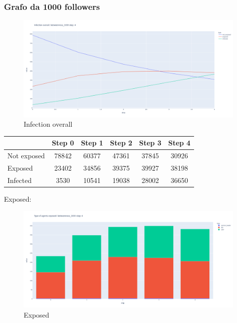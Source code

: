         \subsubsection{Grafo da 1000 followers}
            \begin{figure}[H]
                \includegraphics[width=16cm]{resources/charts/btw_1000_line.png}
                \caption{Infection overall}
                \label{fig:btw_1000_line}
            \end{figure}
            
            \begin{table}[H]
                \centering
                \begin{tabular}{|l|c|c|c|c|c|}
                \hline
                            & Step 0 & Step 1 & Step 2 & Step 3 & Step 4 \\ \hline
                Not exposed & 78842  & 60377  & 47361  & 37845  & 30926  \\ \hline
                Exposed     & 23402  & 34856  & 39375  & 39927  & 38198  \\ \hline
                Infected    & 3530   & 10541  & 19038  & 28002  & 36650  \\ \hline
                \end{tabular}
            \end{table}
            Exposed:
            \begin{figure}[H]
                \includegraphics[width=16cm]{resources/charts/btw_1000_bar.png}
                \caption{Exposed}
                \label{fig:btw_1000_bar}
            \end{figure}
            
